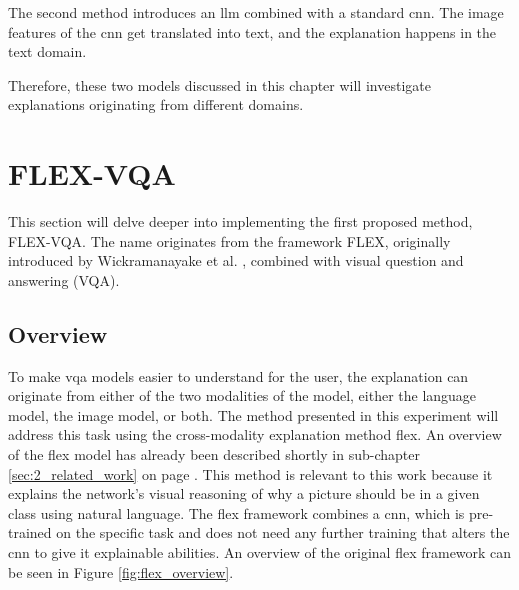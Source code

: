 The second method introduces an \gls{llm} combined with a standard \gls{cnn}. The image features of the \gls{cnn} get translated into text, and the explanation happens in the text domain. 

Therefore, these two models discussed in this chapter will investigate explanations originating from different domains.


    \section{FLEX-VQA}

    This section will delve deeper into implementing the first proposed method, FLEX-VQA. The name originates from the framework FLEX, originally introduced by Wickramanayake et al. \cite{wickramanayakeFLEXFaithfulLinguistic2019}, combined with visual question and answering (VQA). 
    
    \label{sec3:flex_vqa}
        \subsection{Overview}

        To make \gls{vqa} models easier to understand for the user, the explanation can originate from either of the two modalities of the model, either the language model, the image model, or both. 
        The method presented in this experiment will address this task using the cross-modality explanation method \gls{flex}. An overview of the \gls{flex} model has already been described shortly in sub-chapter \ref{sec:2_related_work} on page \pageref{sec:2_related_work}. This method is relevant to this work because it explains the network's visual reasoning of why a picture should be in a given class using natural language. The \gls{flex} framework combines a \gls{cnn}, which is pre-trained on the specific task and does not need any further training that alters the \gls{cnn} to give it explainable abilities. An overview of the original \gls{flex} framework can be seen in Figure \ref{fig:flex_overview}.

